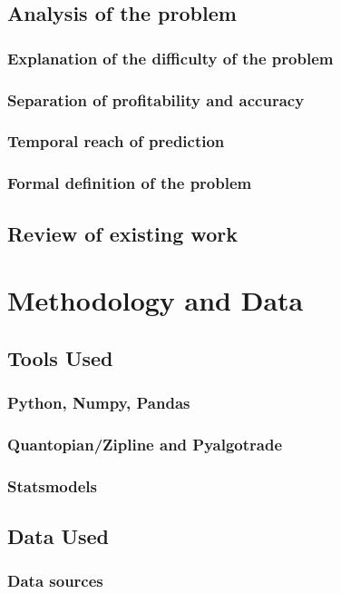 \documentclass[a4paper,11pt]{article}
\begin{document}
\subsection{Analysis of the problem}
\subsubsection{Explanation of the difficulty of the problem}
\subsubsection{Separation of profitability and accuracy}
\subsubsection{Temporal reach of prediction}
\subsubsection{Formal definition of the problem}

\subsection{Review of existing work}

\section{Methodology and Data}
\subsection{Tools Used}
\subsubsection{Python, Numpy, Pandas}
\subsubsection{Quantopian/Zipline and Pyalgotrade}
\subsubsection{Statsmodels}

\subsection{Data Used}
\subsubsection{Data sources}
\end{document}
